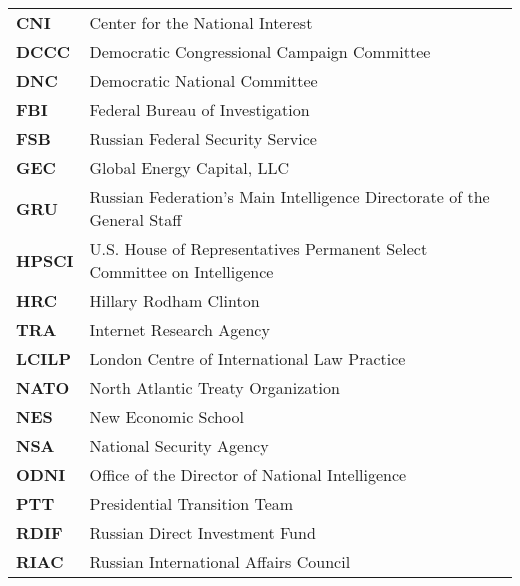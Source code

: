 \begin{longtable}{ p{} p{} }

    \textbf{CNI} & Center for the National Interest \\

    \textbf{DCCC} & Democratic Congressional Campaign Committee \\

    \textbf{DNC} & Democratic National Committee \\

    \textbf{FBI} & Federal Bureau of Investigation \\

    \textbf{FSB} & Russian Federal Security Service \\

    \textbf{GEC} & Global Energy Capital, LLC \\

    \textbf{GRU} & Russian Federation’s Main Intelligence Directorate of the General Staff \\

    \textbf{HPSCI} & U.S. House of Representatives Permanent Select Committee on Intelligence \\

    \textbf{HRC} & Hillary Rodham Clinton \\

    \textbf{TRA} & Internet Research Agency \\

    \textbf{LCILP} & London Centre of International Law Practice \\

    \textbf{NATO} & North Atlantic Treaty Organization \\

    \textbf{NES} & New Economic School \\

    \textbf{NSA} & National Security Agency \\

    \textbf{ODNI} & Office of the Director of National Intelligence \\

    \textbf{PTT} & Presidential Transition Team \\

    \textbf{RDIF} & Russian Direct Investment Fund \\

    \textbf{RIAC} & Russian International Affairs Council \\


\end{longtable}
